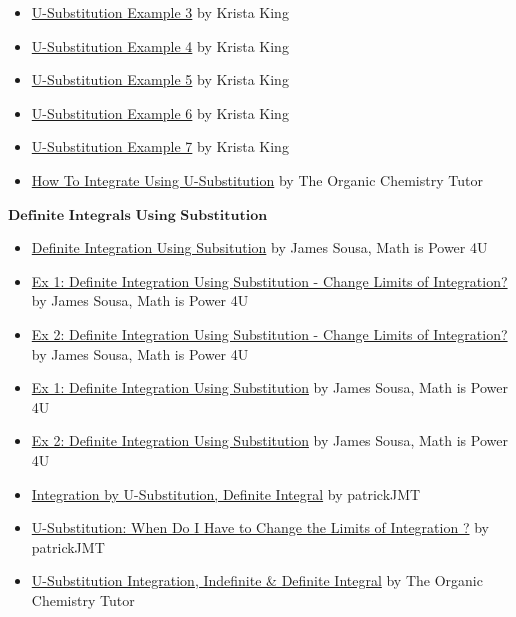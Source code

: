 \begin{itemize}
    \item \href{https://youtu.be/w1FHS-XV64Q}{U-Substitution Example 3} by Krista King
    \item \href{https://youtu.be/_r6xMeO7aEw}{U-Substitution Example 4} by Krista King
    \item \href{https://youtu.be/gIj3objG09Q}{U-Substitution Example 5} by Krista King
    \item \href{https://youtu.be/TlUW6ZenNXY}{U-Substitution Example 6} by Krista King
    \item \href{https://youtu.be/W1WVFJ8iMqQ}{U-Substitution Example 7} by Krista King
    \item \href{https://youtu.be/IAh00vU3FSY}{How To Integrate Using U-Substitution} by The Organic Chemistry Tutor
\end{itemize}

$\textbf{Definite Integrals Using Substitution}$



\begin{itemize}
    \item \href{https://www.youtube.com/watch?v=hjr27pv8pHQ}{Definite Integration Using Subsitution} by James Sousa, Math is Power 4U
    \item \href{https://www.youtube.com/watch?v=jUwNl_PDeDY}{Ex 1: Definite Integration Using Substitution - Change Limits of Integration?} by James Sousa, Math is Power 4U
    \item \href{https://www.youtube.com/watch?v=n3DGt7cnS70}{Ex 2: Definite Integration Using Substitution - Change Limits of Integration?} by James Sousa, Math is Power 4U
    \item \href{https://www.youtube.com/watch?v=8ofGv7TQL34}{Ex 1: Definite Integration Using Substitution} by James Sousa, Math is Power 4U
    \item \href{https://www.youtube.com/watch?v=M-IUhe-iQx0}{Ex 2: Definite Integration Using Substitution} by James Sousa, Math is Power 4U
    \item \href{https://youtu.be/3XOzg2-DdTA}{Integration by U-Substitution, Definite Integral} by patrickJMT
    \item \href{https://youtu.be/FJoyIAIC1Ag}{U-Substitution: When Do I Have to Change the Limits of Integration ?} by patrickJMT
    \item \href{https://youtu.be/0A2RlnutO8U}{U-Substitution Integration, Indefinite \& Definite Integral} by The Organic Chemistry Tutor
\end{itemize}

